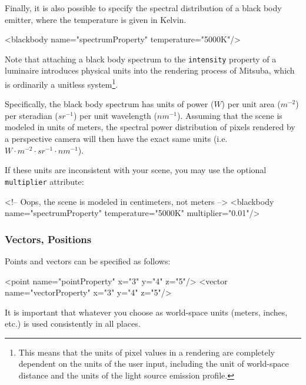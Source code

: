 Finally, it is also possible to specify the spectral distribution of a black body emitter, where the temperature is given in Kelvin.
\begin{xml}
<blackbody name="spectrumProperty" temperature="5000K"/>
\end{xml}
Note that attaching a black body spectrum to the \texttt{intensity} property
of a luminaire introduces physical units into the rendering process of 
Mitsuba, which is ordinarily a unitless system\footnote{This means that the 
units of pixel values in a rendering are completely dependent on the units of 
the user input, including the unit of world-space distance and the units of 
the light source emission profile.}.

Specifically, the black body spectrum has units of power ($W$) per 
unit area ($m^{-2}$) per steradian ($sr^{-1}$) per unit wavelength ($nm^{-1}$).
Assuming that the scene is modeled in units of meters, 
the spectral power distribution of pixels rendered by a perspective 
camera will then have the exact same units (i.e. $W\cdot m^{-2}\cdot sr^{-1} \cdot nm^{-1}$).

If these units are inconsistent with your scene, you may use the
optional \texttt{multiplier} attribute: 
\begin{xml}
<!-- Oops, the scene is modeled in centimeters, not meters -->
<blackbody name="spectrumProperty" temperature="5000K" multiplier="0.01"/>
\end{xml}

\subsubsection{Vectors, Positions}
Points and vectors can be specified as follows:
\begin{xml}
<point name="pointProperty" x="3" y="4" z="5"/>
<vector name="vectorProperty" x="3" y="4" z="5"/>
\end{xml}
It is important that whatever you choose as world-space units (meters, inches, etc.) is 
used consistently in all places.
